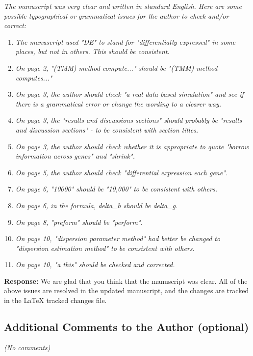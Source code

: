\documentclass{article}
\begin{document}
\begin{flushleft}
\emph{The manuscript was very clear and written in standard English. Here are some possible typographical or grammatical issues for the author to check and/or correct:}
\begin{enumerate}
\item \emph{The manuscript used "DE" to stand for "differentially expressed" in some places, but not in others. This should be consistent.}
\item \emph{On page 2, "(TMM) method compute..." should be "(TMM) method computes..."}
\item\emph{ On page 3, the author should check "a real data-based simulation" and see if there is a grammatical error or change the wording to a clearer way.}
\item \emph{On page 3, the "results and discussions sections" should probably be "results and discussion sections" - to be consistent with section titles.}
\item \emph{On page 3, the author should check whether it is appropriate to quote "borrow information across genes" and "shrink".}
\item \emph{On page 5, the author should check "differential expression each gene".}
\item \emph{On page 6, "10000" should be "10,000" to be consistent with others.}
\item \emph{On page 6, in the formula, delta\_h should be delta\_g.}
\item \emph{On page 8, "preform" should be "perform".}
\item \emph{On page 10, "dispersion parameter method" had better be changed to "dispersion estimation method" to be consistent with others.}
\item \emph{On page 10, "a this" should be checked and corrected.}
\end{enumerate}

{\bf Response:} We are glad that you think that the manuscript was clear. All of the above issues are resolved in the updated manuscript, and the changes are tracked in the LaTeX tracked changes file. 

\subsection{Additional Comments to the Author (optional)}

\emph{(No comments)}

\end{flushleft}
\end{document}
